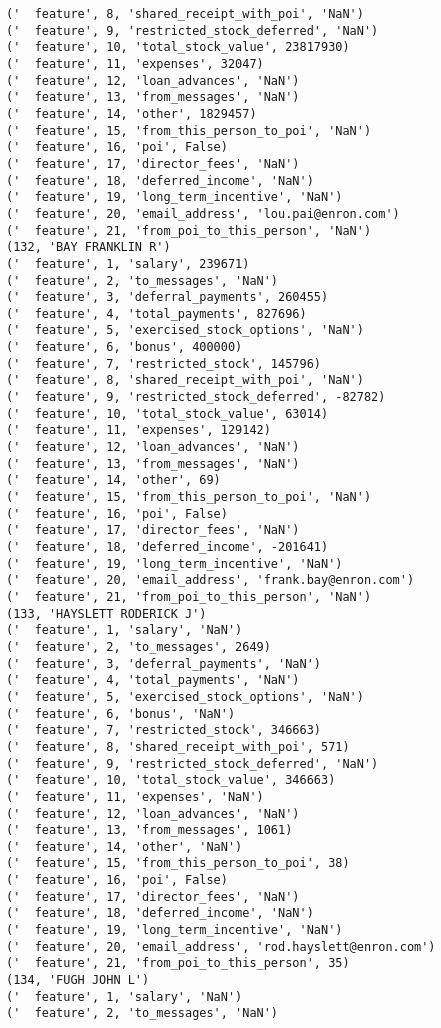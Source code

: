 \begin{verbatim}
('  feature', 8, 'shared_receipt_with_poi', 'NaN')
('  feature', 9, 'restricted_stock_deferred', 'NaN')
('  feature', 10, 'total_stock_value', 23817930)
('  feature', 11, 'expenses', 32047)
('  feature', 12, 'loan_advances', 'NaN')
('  feature', 13, 'from_messages', 'NaN')
('  feature', 14, 'other', 1829457)
('  feature', 15, 'from_this_person_to_poi', 'NaN')
('  feature', 16, 'poi', False)
('  feature', 17, 'director_fees', 'NaN')
('  feature', 18, 'deferred_income', 'NaN')
('  feature', 19, 'long_term_incentive', 'NaN')
('  feature', 20, 'email_address', 'lou.pai@enron.com')
('  feature', 21, 'from_poi_to_this_person', 'NaN')
(132, 'BAY FRANKLIN R')
('  feature', 1, 'salary', 239671)
('  feature', 2, 'to_messages', 'NaN')
('  feature', 3, 'deferral_payments', 260455)
('  feature', 4, 'total_payments', 827696)
('  feature', 5, 'exercised_stock_options', 'NaN')
('  feature', 6, 'bonus', 400000)
('  feature', 7, 'restricted_stock', 145796)
('  feature', 8, 'shared_receipt_with_poi', 'NaN')
('  feature', 9, 'restricted_stock_deferred', -82782)
('  feature', 10, 'total_stock_value', 63014)
('  feature', 11, 'expenses', 129142)
('  feature', 12, 'loan_advances', 'NaN')
('  feature', 13, 'from_messages', 'NaN')
('  feature', 14, 'other', 69)
('  feature', 15, 'from_this_person_to_poi', 'NaN')
('  feature', 16, 'poi', False)
('  feature', 17, 'director_fees', 'NaN')
('  feature', 18, 'deferred_income', -201641)
('  feature', 19, 'long_term_incentive', 'NaN')
('  feature', 20, 'email_address', 'frank.bay@enron.com')
('  feature', 21, 'from_poi_to_this_person', 'NaN')
(133, 'HAYSLETT RODERICK J')
('  feature', 1, 'salary', 'NaN')
('  feature', 2, 'to_messages', 2649)
('  feature', 3, 'deferral_payments', 'NaN')
('  feature', 4, 'total_payments', 'NaN')
('  feature', 5, 'exercised_stock_options', 'NaN')
('  feature', 6, 'bonus', 'NaN')
('  feature', 7, 'restricted_stock', 346663)
('  feature', 8, 'shared_receipt_with_poi', 571)
('  feature', 9, 'restricted_stock_deferred', 'NaN')
('  feature', 10, 'total_stock_value', 346663)
('  feature', 11, 'expenses', 'NaN')
('  feature', 12, 'loan_advances', 'NaN')
('  feature', 13, 'from_messages', 1061)
('  feature', 14, 'other', 'NaN')
('  feature', 15, 'from_this_person_to_poi', 38)
('  feature', 16, 'poi', False)
('  feature', 17, 'director_fees', 'NaN')
('  feature', 18, 'deferred_income', 'NaN')
('  feature', 19, 'long_term_incentive', 'NaN')
('  feature', 20, 'email_address', 'rod.hayslett@enron.com')
('  feature', 21, 'from_poi_to_this_person', 35)
(134, 'FUGH JOHN L')
('  feature', 1, 'salary', 'NaN')
('  feature', 2, 'to_messages', 'NaN')

\end{verbatim}
